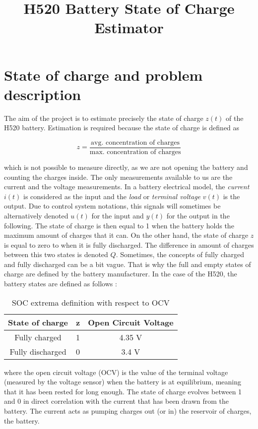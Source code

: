 \documentclass{article}
\title{H520 Battery State of Charge Estimator}
\begin{document}
 

\section{State of charge and problem description}

The aim of the project is to estimate precisely the state of charge $z(t)$ of the H520 battery. Estimation is required because the state of charge is defined as \

\begin{equation}
z = \frac{\text{avg. concentration of charges}}{\text{max. concentration of charges}}
\end{equation}

\noindent which is not possible to measure directly, as we are not opening the battery and counting the charges inside. The only measurements available to us are the current and the voltage measurements. In a battery electrical model, the \textit{current} $i(t)$ is considered as the input and the \textit{load} or \textit{terminal voltage} $v(t)$ is the output. Due to control system notations, this signals will sometimes be alternatively denoted $u(t)$ for the input and $y(t)$ for the output in the following.
The state of charge is then equal to 1 when the battery holds the maximum amount of charges that it can. On the other hand, the state of charge $z$ is equal to zero to when it is fully discharged. The difference in amount of charges between this two states is denoted $Q$. Sometimes, the concepts of fully charged and fully discharged can be a bit vague. That is why the full and empty states of charge are defined by the battery manufacturer. In the case of the H520, the battery states are defined as follows :

\begin{table}[h]
\centering
\begin{tabular}{c|c|c}
    State of charge & z & Open Circuit Voltage \\
    \hline
    Fully charged & 1 & 4.35 V \\
    \hline
    Fully discharged & 0 & 3.4 V \\

\end{tabular}
\caption{SOC extrema definition with respect to OCV}
\label{maxSOCOCV}
\end{table}

\noindent where the open circuit voltage (OCV) is the value of the terminal voltage (measured by the voltage sensor) when the battery is at equilibrium, meaning that it has been rested for long enough. The state of charge evolves between 1 and 0 in direct correlation with the current that has been drawn from the battery. The current acts as pumping charges out (or in) the reservoir of charges, the battery. 
\end{document}

